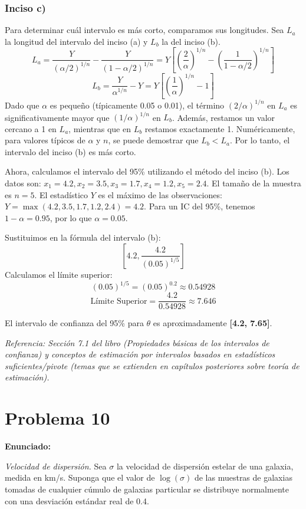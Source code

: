 \documentclass[12pt]{article}
\begin{document}
\subsubsection{Inciso c)}
Para determinar cuál intervalo es más corto, comparamos sus longitudes. Sea $L_a$ la longitud del intervalo del inciso (a) y $L_b$ la del inciso (b).
$$ L_a = \frac{Y}{(\alpha/2)^{1/n}} - \frac{Y}{(1 - \alpha/2)^{1/n}} = Y \left[ \left(\frac{2}{\alpha}\right)^{1/n} - \left(\frac{1}{1 - \alpha/2}\right)^{1/n} \right] $$
$$ L_b = \frac{Y}{\alpha^{1/n}} - Y = Y \left[ \left(\frac{1}{\alpha}\right)^{1/n} - 1 \right] $$
Dado que $\alpha$ es pequeño (típicamente 0.05 o 0.01), el término $(2/\alpha)^{1/n}$ en $L_a$ es significativamente mayor que $(1/\alpha)^{1/n}$ en $L_b$. Además, restamos un valor cercano a 1 en $L_a$, mientras que en $L_b$ restamos exactamente 1. Numéricamente, para valores típicos de $\alpha$ y $n$, se puede demostrar que $L_b < L_a$. Por lo tanto, el intervalo del inciso (b) es más corto.

Ahora, calculamos el intervalo del 95\% utilizando el método del inciso (b).
Los datos son: $x_1 = 4.2, x_2 = 3.5, x_3 = 1.7, x_4 = 1.2, x_5 = 2.4$.
El tamaño de la muestra es $n = 5$.
El estadístico $Y$ es el máximo de las observaciones: $Y = \max(4.2, 3.5, 1.7, 1.2, 2.4) = 4.2$.
Para un IC del 95\%, tenemos $1 - \alpha = 0.95$, por lo que $\alpha = 0.05$.

Sustituimos en la fórmula del intervalo (b):
$$ \left[ 4.2, \frac{4.2}{(0.05)^{1/5}} \right] $$
Calculamos el límite superior:
$$ (0.05)^{1/5} = (0.05)^{0.2} \approx 0.54928 $$
$$ \text{Límite Superior} = \frac{4.2}{0.54928} \approx 7.646 $$

El intervalo de confianza del 95\% para $\theta$ es aproximadamente \textbf{[4.2, 7.65]}.

\textit{Referencia: Sección 7.1 del libro (Propiedades básicas de los intervalos de confianza) y conceptos de estimación por intervalos basados en estadísticos suficientes/pivote (temas que se extienden en capítulos posteriores sobre teoría de estimación).}


\section{Problema 10}

\textbf{Enunciado:}

\textit{Velocidad de dispersión.} Sea $\sigma$ la velocidad de dispersión estelar de una galaxia, medida en km/s. Suponga que el valor de $\log(\sigma)$ de las muestras de galaxias tomadas de cualquier cúmulo de galaxias particular se distribuye normalmente con una desviación estándar real de 0.4.
\end{document}
